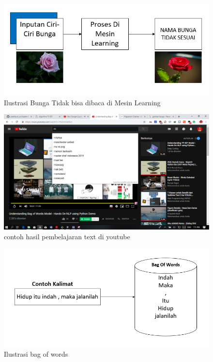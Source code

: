 \begin{figure}
      \centerline{\includegraphics[width=1\textwidth]
      {figures/cokro/c56}}
      \caption{Ilustrasi Bunga Tidak bisa dibaca di Mesin Learning}
      \label{c56}
      \end{figure}

\begin{figure}
      \centerline{\includegraphics[width=1\textwidth]
      {figures/cokro/c57}}
      \caption{contoh hasil pembelajaran text di youtube}
      \label{c57}
      \end{figure}

\begin{figure}
      \centerline{\includegraphics[width=1\textwidth]
      {figures/cokro/c58}}
      \caption{Ilustrasi bag of words}
      \label{c58}
      \end{figure}

